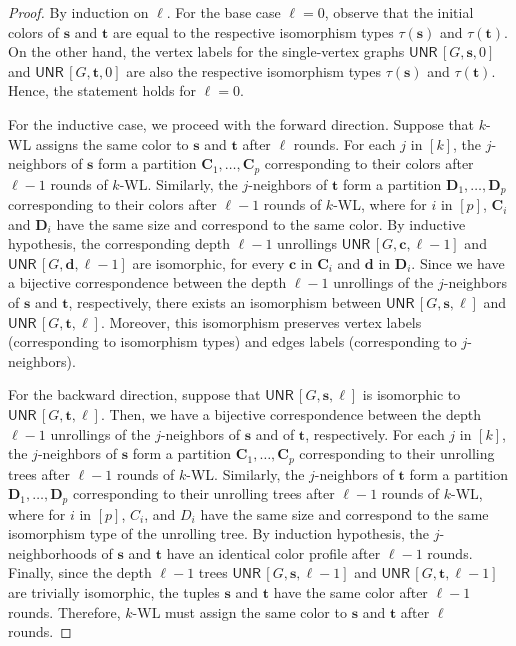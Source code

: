 \documentclass{article}
\theoremstyle{definition}
\renewcommand{\vec}[1]{\mathbf{#1}}
\newcommand{\kwl}{$k$-\textsf{WL}\xspace}
\newcommand{\UNR}{\textsf{UNR}\,}
\begin{document}
\begin{proof}
	By induction on $\ell$. For the base case $\ell = 0$, observe that the initial colors of $\vec{s}$ and $\vec{t}$ are equal to the 
	respective isomorphism types $\tau(\vec{s})$ and $\tau(\vec{t})$. On the other hand, the vertex labels for the single-vertex graphs $\UNR[G,\vec{s},0]$ and $\UNR[G,\vec{t},0]$ are also the respective isomorphism types $\tau(\vec{s})$ and $\tau(\vec{t})$. Hence, the statement holds for $\ell = 0$. 
	
	For the inductive case, we proceed with the forward direction. Suppose that \kwl assigns the same color to $\vec{s}$ and $\vec{t}$ after $\ell$ rounds. For each $j$ in $[k]$, the $j$-neighbors of $\vec{s}$ form a partition $\vec{C}_1,\dots,\vec{C}_p$ corresponding to their colors after $\ell-1$ rounds of \kwl. Similarly, the $j$-neighbors of $\vec{t}$ form a partition $\vec{D}_1,\dots,\vec{D}_p$ corresponding to their colors after $\ell-1$ rounds of \kwl, where for $i$ in $[p]$, $\vec{C}_i$ and $\vec{D}_i$ have the same size and correspond to the same color. By inductive hypothesis, the corresponding depth $\ell -1$ unrollings $\UNR[G,\vec{c},\ell-1]$ and $\UNR[G,\vec{d},\ell-1]$ are isomorphic, for every $\vec{c}$ in $\vec{C}_i$ and $\vec{d}$ in $\vec{D}_i$. Since we have a bijective correspondence between the depth $\ell-1$ unrollings of the $j$-neighbors of $\vec{s}$ and $\vec{t}$, respectively, there exists an isomorphism between $\UNR[G,\vec{s},\ell]$ and $\UNR[G,\vec{t},\ell]$. Moreover, this isomorphism preserves vertex labels (corresponding to isomorphism types) and edges labels (corresponding to $j$-neighbors). 
	
	For the backward direction, suppose that $\UNR[G,\vec{s},\ell]$ is isomorphic to $\UNR[G,\vec{t},\ell]$. Then, we have a bijective correspondence between the depth $\ell-1$ unrollings of the $j$-neighbors of $\vec{s}$ and of $\vec{t}$, respectively. For each $j$ in $[k]$, the $j$-neighbors of $\vec{s}$ form a partition $\vec{C}_1,\dots,\vec{C}_p$ corresponding to their unrolling trees after $\ell-1$ rounds of $k$-WL. Similarly, the $j$-neighbors of $\vec{t}$ form a partition $\vec{D}_1,\dots,\vec{D}_p$ corresponding to their unrolling trees after $\ell-1$ rounds of $k$-WL, where for $i$ in $[p]$, $C_i$, and $D_i$ have the same size and correspond to the same isomorphism type of the unrolling tree. By induction hypothesis, the $j$-neighborhoods of $\vec{s}$ and $\vec{t}$ have an identical color profile after $\ell-1$ rounds. Finally, since the depth $\ell -1$ trees $\UNR[G,\vec{s},\ell-1]$ and $\UNR[G,\vec{t},\ell-1]$ are trivially isomorphic, the tuples $\vec{s}$ and $\vec{t}$ have the same color after $\ell-1$ rounds. Therefore, \kwl must assign the same color to $\vec{s}$ and $\vec{t}$ after $\ell$ rounds.  
\end{proof}
\end{document}
